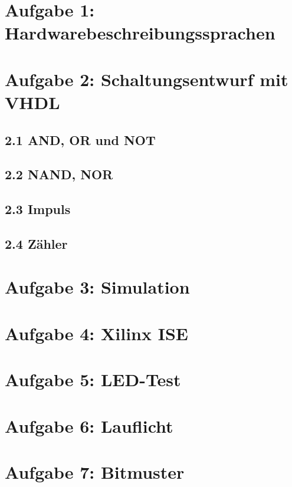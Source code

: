 \documentclass[parskip=full]{scrartcl}
\begin{document}
	\section*{Aufgabe 1: Hardwarebeschreibungssprachen}
	\section*{Aufgabe 2: Schaltungsentwurf mit VHDL}
		\subsection*{2.1 AND, OR und NOT}

		\subsection*{2.2 NAND, NOR}
		
		\subsection*{2.3 Impuls}
		
		\subsection*{2.4 Zähler}
	\section*{Aufgabe 3: Simulation}
	\section*{Aufgabe 4: Xilinx ISE}
	\section*{Aufgabe 5: LED-Test}
	\section*{Aufgabe 6: Lauflicht}
	\section*{Aufgabe 7: Bitmuster}
	
	
\end{document}
